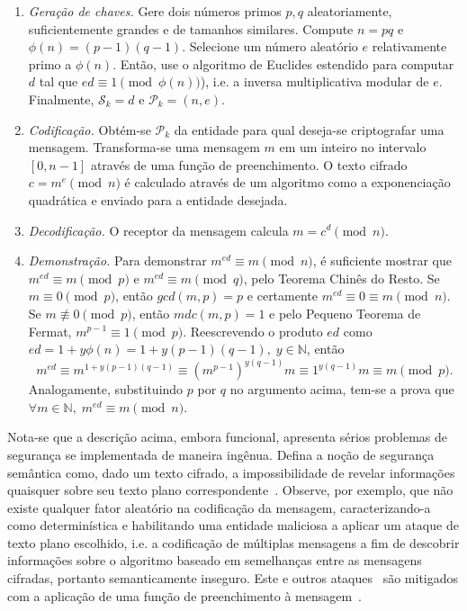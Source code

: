 \documentclass[12pt]{report}
\newcommand{\pk}{\mathcal{P}_k}
\begin{document}
\begin{enumerate}

  \item[] \emph{Geração de chaves.} Gere dois números primos $p, q$
      aleatoriamente, suficientemente grandes e de tamanhos similares. Compute
        $n = p q$ e $\phi(n) = (p - 1) (q - 1)$. Selecione um número aleatório
        $e$ relativamente primo a $\phi(n)$. Então, use o algoritmo de Euclides
        estendido para computar $d$ tal que $ed \equiv 1 \pmod{\phi(n)}$), i.e.
        a inversa multiplicativa modular de $e$. Finalmente, $\mathcal{S}_k =
        d$ e $\mathcal{P}_k = (n, e)$.

  \item[] \emph{Codificação.} Obtém-se $\pk{}$ da entidade para qual deseja-se
      criptografar uma mensagem. Transforma-se uma mensagem $m$ em um inteiro
        no intervalo $[0, n - 1]$ através de uma função de preenchimento.  O
        texto cifrado $c = m^e \pmod{n}$ é calculado através de um algoritmo
        como a exponenciação quadrática e enviado para a entidade desejada.

  \item[] \emph{Decodificação.} O receptor da mensagem calcula $m = c^d
      \pmod{n}$.

  \item[] \emph{Demonstração.} Para demonstrar $m^{ed} \equiv m \pmod{n}$, é
      suficiente mostrar que $m^{ed} \equiv m \pmod{p}$ e $m^{ed} \equiv m
        \pmod{q}$, pelo Teorema Chinês do Resto. Se $m \equiv 0 \pmod{p}$,
        então $gcd(m, p) = p$ e certamente $m^{ed} \equiv 0 \equiv m \pmod{n}$.
        Se $m \not\equiv 0 \pmod{p}$, então $mdc(m, p) = 1$ e pelo Pequeno
        Teorema de Fermat, $m^{p - 1} \equiv 1 \pmod{p}$. Reescrevendo o
        produto $ed$ como $ed = 1 + y\phi(n) = 1 + y(p - 1)(q - 1), \; y \in
        \mathbb{N}$, então
        \begin{equation}
          m^{ed} \equiv m^{1 + y(p-1)(q-1)} \equiv
            (m^{p-1})^{y(q-1)}m \equiv 1^{y(q-1)}m \equiv m \pmod{p}.
        \end{equation}
        Analogamente, substituindo $p$ por $q$ no argumento acima, tem-se a
        prova que $\forall m \in \mathbb{N}, \; m^{ed} \equiv m \pmod{n}$.

\end{enumerate}

Nota-se que a descrição acima, embora funcional, apresenta sérios problemas de
segurança se implementada de maneira ingênua. Defina a noção de segurança
semântica como, dado um texto cifrado, a impossibilidade de revelar
informações quaisquer sobre seu texto plano
correspondente~\cite{Goldwasser:1982:PEA:800070.802212}. Observe, por exemplo,
que não existe qualquer fator aleatório na codificação da mensagem,
caracterizando-a como determinística e habilitando uma entidade
maliciosa a aplicar um ataque de texto plano escolhido, i.e. a codificação
de múltiplas mensagens a fim de descobrir informações sobre o algoritmo
baseado em semelhanças entre as mensagens cifradas, portanto semanticamente
inseguro. Este e outros ataques~\cite{Boneh99twentyyears} são mitigados com
a aplicação de uma função de preenchimento à mensagem~\cite{Bellare1995}.
\end{document}
